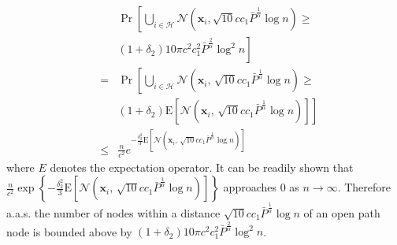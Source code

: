 \documentclass[english]{IEEEtran}
\theoremstyle{plain}
\theoremstyle{plain}
\theoremstyle{plain}
\theoremstyle{remark}
\begin{document}
\begin{eqnarray}
 &  & \Pr\left[\bigcup_{i\in\mathcal{H}}\mathcal{N}\left(\boldsymbol{x}_{i},\sqrt{10}cc_{1}\bar{P}^{\frac{1}{\alpha}}\log n\right)\geq\right.\nonumber \\
 &  & \left.\left(1+\delta_{2}\right)10\pi c^{2}c_{1}^{2}\bar{P}^{\frac{2}{\alpha}}\log^{2}n\right]\nonumber \\
 & = & \Pr\left[\bigcup_{i\in\mathcal{H}}\mathcal{N}\left(\boldsymbol{x}_{i},\,\sqrt{10}cc_{1}\bar{P}^{\frac{1}{\alpha}}\log n\right)\geq\right.\nonumber \\
 &  & \left.\left(1+\delta_{2}\right)\textrm{E}\left[\mathcal{N}\left(\boldsymbol{x}_{i},\,\sqrt{10}cc_{1}\bar{P}^{\frac{1}{\alpha}}\log n\right)\right]\right]\nonumber \\
 & \leq & \frac{n}{c^{2}}e^{-\frac{\delta_{2}^{2}}{3}\textrm{E}\left[\mathcal{N}\left(\boldsymbol{x}_{i},\,\sqrt{10}cc_{1}\bar{P}^{\frac{1}{\alpha}}\log n\right)\right]}\label{eq:number of conflicting nodes}
\end{eqnarray}
where $E$ denotes the expectation operator. It can be readily shown
that $\frac{n}{c^{2}}\exp\left\{ -\frac{\delta_{2}^{2}}{3}\textrm{E}\left[\mathcal{N}\left(\boldsymbol{x}_{i},\,\sqrt{10}cc_{1}\bar{P}^{\frac{1}{\alpha}}\log n\right)\right]\right\} $
approaches $0$ as $n\rightarrow\infty$. Therefore a.a.s. the number
of nodes within a distance $\sqrt{10}cc_{1}\bar{P}^{\frac{1}{\alpha}}\log n$
of an open path node is bounded above by $\left(1+\delta_{2}\right)10\pi c^{2}c_{1}^{2}\bar{P}^{\frac{2}{\alpha}}\log^{2}n$.
\end{document}
